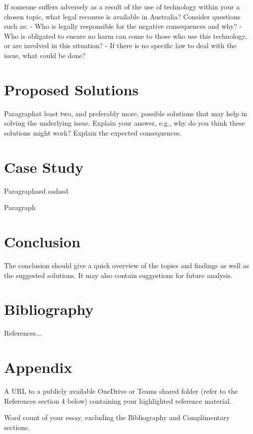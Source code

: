 \documentclass[12pt,a4paper]{article}
\begin{document}
If someone suffers adversely as a result of the use of technology within your a chosen topic, what legal recourse is
available in Australia? Consider questions such as:
- Who is legally responsible for the negative consequences and why?
- Who
is obligated to ensure no harm can come to those who use this technology, or are involved
in this situation?
- If there
is no specific law to deal with the issue, what could be done?


\section{Proposed Solutions}

Paragraphat least two, and preferably more, possible solutions that may help in solving the underlying issue. Explain
your answer, e.g., why do you think these solutions might work? Explain the expected consequences.


\section{Case Study}

Paragraphasd sadasd

Paragraph


\section{Conclusion}

The conclusion should give a quick overview of the topics and findings as well as the suggested solutions. It may also contain suggestions for future analysis.


\section{Bibliography}

References...


\section{Appendix}

A URL to a publicly available OneDrive or Teams shared folder (refer to the References section 4 below) containing your highlighted reference material.

Word count of your essay, excluding the Bibliography and Complimentary sections.

\end{document}
